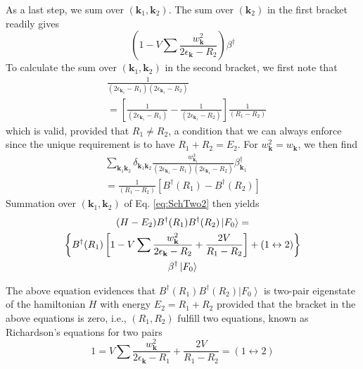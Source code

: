 \documentclass[epj]{svjour}
\newcommand{\vk}{\ensuremath{\mathbf{k}}}
\begin{document}
As a last step, we sum over $(\vk_1,\vk_2)$.  The sum over $(\vk_2)$ in the first bracket readily gives 
\begin{equation}\label{eq:1-v}
\left(1-V\sum\frac{w_{\mathbf{k} }^2}{2\epsilon_{\mathbf{k} }-R_2}\right)\beta^\dagger
\end{equation}
To calculate the sum over $(\vk_1,\vk_2)$ in the second bracket, we first note that
\begin{equation}\label{eq:inverse}
\begin{split}
&\frac{1}{\left(2\epsilon_{\mathbf{k} _1}-R_1\right)
\left(2\epsilon_{\mathbf{k} _1}-R_2\right)}\\&=\left[
\frac{1}{\left(2\epsilon_{\mathbf{k} _1}-R_1\right)}-\frac{1}{\left(2\epsilon_{\mathbf{k}
_1}-R_2\right) }\right]\frac1{\left(R_1-R_2\right) } 
\end{split}
\end{equation}
which is valid, provided that $R_1\neq{}R_2$,
a condition that we can always enforce since the unique requirement is to have $R_1+R_2=E_2$. For $w^2_{{\mathbf{k} }}=w_{{\mathbf{k} }}$, we then find 
\begin{multline}\label{eq:deltakk}
\sum_{{\mathbf{k} _1}{\mathbf{k} _2}}\delta_{{\mathbf{k} _1}{\mathbf{k} _2}}\frac{w^3_{{\mathbf{k} _1}}}{\left(2%
\epsilon_{\mathbf{k} _1}-R_1\right) \left(2\epsilon_{\mathbf{k}
_1}-R_2\right)}\beta^\dagger_{{\mathbf{k} _1}}\\=\frac1{\left(R_1-R_2\right) }[B^\dagger(R_1)-B^\dagger(R_2)]
\end{multline}
 Summation over $(\vk_1,\vk_2)$ of Eq. \eqref{eq:SchTwo2} then yields 
\begin{multline}  \label{eq:SchTwo3}
(H-E_2)B^{\dagger}(R_1)B^{\dagger}(R_2)\left|F_0\right>   = \\
\left\{B^{\dagger}(R_1)\left[1-V\sum\frac{w_{\mathbf{k} }^2}{2\epsilon_{%
\mathbf{k} }-R_2}+\frac{2V}{R_1-R_2}\right] +(1\leftrightarrow2)\right\}  \\
\beta^{\dagger}\left|F_0\right>  
\end{multline}


The above equation evidences that $B^{\dagger}(R_1)B^{\dagger}(R_2)%
\left|F_0\right>  $ is two-pair eigenstate of the hamiltonian $H$ with  energy $%
E _2=R_1+R_2$ provided that the bracket in the above equations is zero, i.e., $\left(R_1,R_2\right) $ fulfill two
equations, known as Richardson's equations for two pairs 
\begin{equation}
1=V\sum\frac{w_{\mathbf{k} }^2}{2\epsilon_{\mathbf{k} }-R_1}+\frac{2V}{R_1-R_2}%
=(1\leftrightarrow2)
\end{equation}
\end{document}
